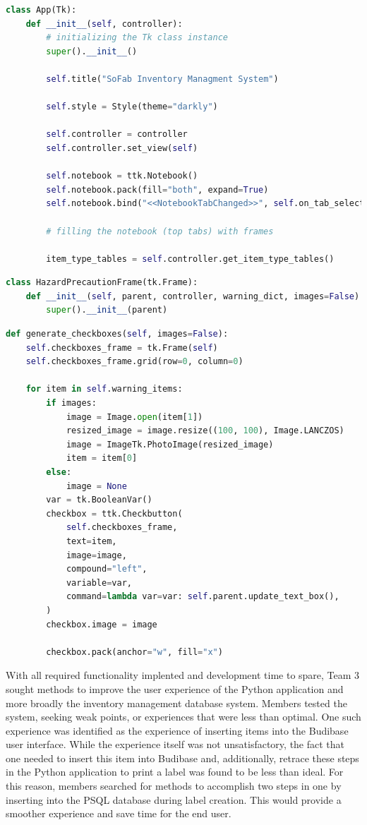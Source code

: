 \documentclass{article}
\begin{document}
\begin{lstlisting}[language=Python]
class App(Tk):
    def __init__(self, controller):
        # initializing the Tk class instance
        super().__init__()

        self.title("SoFab Inventory Managment System")

        self.style = Style(theme="darkly")

        self.controller = controller
        self.controller.set_view(self)

        self.notebook = ttk.Notebook()
        self.notebook.pack(fill="both", expand=True)
        self.notebook.bind("<<NotebookTabChanged>>", self.on_tab_selection)

        # filling the notebook (top tabs) with frames

        item_type_tables = self.controller.get_item_type_tables()
\end{lstlisting}
\begin{lstlisting}[language=Python]
class HazardPrecautionFrame(tk.Frame):
    def __init__(self, parent, controller, warning_dict, images=False):
        super().__init__(parent)
\end{lstlisting}
\begin{lstlisting}[language=Python]
def generate_checkboxes(self, images=False):
    self.checkboxes_frame = tk.Frame(self)
    self.checkboxes_frame.grid(row=0, column=0)

    for item in self.warning_items:
        if images:
            image = Image.open(item[1])
            resized_image = image.resize((100, 100), Image.LANCZOS)
            image = ImageTk.PhotoImage(resized_image)
            item = item[0]
        else:
            image = None
        var = tk.BooleanVar()
        checkbox = ttk.Checkbutton(
            self.checkboxes_frame,
            text=item,
            image=image,
            compound="left",
            variable=var,
            command=lambda var=var: self.parent.update_text_box(),
        )
        checkbox.image = image

        checkbox.pack(anchor="w", fill="x")
\end{lstlisting}

With all required functionality implented and development time to spare, Team 3 sought methods to improve the user experience of 
the Python application and more broadly the inventory management database system. Members tested the system, seeking weak points, or 
experiences that were less than optimal. One such experience was identified as the experience of inserting items into the 
Budibase user interface. While the experience itself was not unsatisfactory, the fact that one needed to insert this item into 
Budibase and, additionally, retrace these steps in the Python application to print a label was found to be less than ideal. For this 
reason, members searched for methods to accomplish two steps in one by inserting into the PSQL database during label creation. This would 
provide a smoother experience and save time for the end user.
\end{document}
